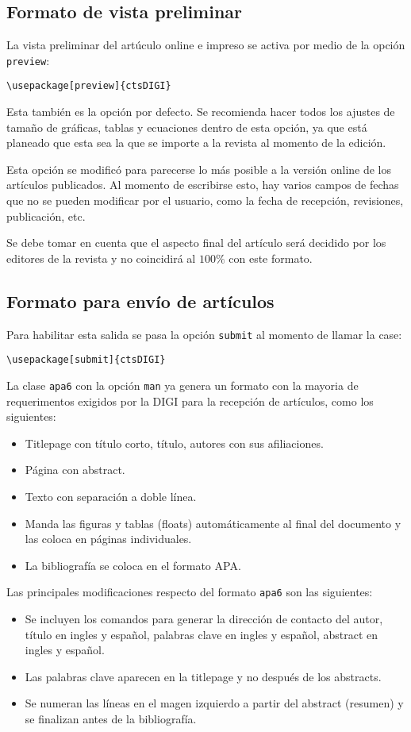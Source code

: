 \documentclass{article}
\begin{document}
\subsection{Formato de vista preliminar}
La vista preliminar del artúculo online e impreso se activa por medio de la opción \texttt{preview}:
\begin{verbatim}
\usepackage[preview]{ctsDIGI}
\end{verbatim}

Esta también es la opción por defecto. Se recomienda hacer todos los ajustes de tamaño de gráficas, tablas y ecuaciones dentro de esta opción, ya que está planeado que esta sea la que se importe a la revista al momento de la edición.

Esta opción se modificó para parecerse lo más posible a la versión online de los artículos publicados. Al momento de escribirse esto, hay varios campos de fechas que no se pueden modificar por el usuario, como la fecha de recepción, revisiones, publicación, etc.

Se debe tomar en cuenta que el aspecto final del artículo será decidido por los editores de la revista y no coincidirá al $100\%$ con este formato.

\subsection{Formato para envío de artículos}
Para habilitar esta salida se pasa la opción \texttt{submit} al momento de llamar la case:
\begin{verbatim}
\usepackage[submit]{ctsDIGI}
\end{verbatim}

La clase \texttt{apa6} con la opción \texttt{man} ya genera un formato con la mayoria de requerimentos exigidos por la DIGI para la recepción de artículos, como los siguientes:
\begin{itemize}
\item Titlepage con título corto, título, autores con sus afiliaciones.
\item Página con abstract.
\item Texto con separación a doble línea.
\item Manda las figuras y tablas (floats) automáticamente al final del documento y las coloca en páginas individuales.
\item La bibliografía se coloca en el formato APA.
\end{itemize}

Las principales modificaciones respecto del formato \texttt{apa6} son las siguientes:
\begin{itemize}
\item Se incluyen los comandos para generar la dirección de contacto del autor, título en ingles y español, palabras clave en ingles y español, abstract en ingles y español.
\item Las palabras clave aparecen en la titlepage y no después de los abstracts.
\item Se numeran las líneas en el magen izquierdo a partir del abstract (resumen) y se finalizan antes de la bibliografía.
\end{itemize}
\end{document}

